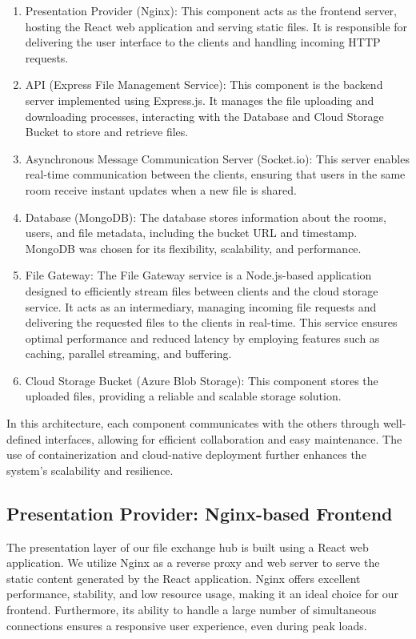 \documentclass[a4paper,fleqn]{cas-dc}
\begin{document}
\begin{enumerate}
\item Presentation Provider (Nginx): This component acts as the frontend server, hosting the React web application and serving static files. It is responsible for delivering the user interface to the clients and handling incoming HTTP requests.
\item API (Express File Management Service): This component is the backend server implemented using Express.js. It manages the file uploading and downloading processes, interacting with the Database and Cloud Storage Bucket to store and retrieve files.
\item Asynchronous Message Communication Server (Socket.io): This server enables real-time communication between the clients, ensuring that users in the same room receive instant updates when a new file is shared.
\item Database (MongoDB): The database stores information about the rooms, users, and file metadata, including the bucket URL and timestamp. MongoDB was chosen for its flexibility, scalability, and performance.
\item File Gateway: The File Gateway service is a Node.js-based application designed to efficiently stream files between clients and the cloud storage service. It acts as an intermediary, managing incoming file requests and delivering the requested files to the clients in real-time. This service ensures optimal performance and reduced latency by employing features such as caching, parallel streaming, and buffering.
\item Cloud Storage Bucket (Azure Blob Storage): This component stores the uploaded files, providing a reliable and scalable storage solution.
\end{enumerate}

In this architecture, each component communicates with the others through well-defined interfaces, allowing for efficient collaboration and easy maintenance. The use of containerization and cloud-native deployment further enhances the system's scalability and resilience.

\subsection{Presentation Provider: Nginx-based Frontend}

The presentation layer of our file exchange hub is built using a React web application. We utilize Nginx as a reverse proxy and web server to serve the static content generated by the React application. Nginx offers excellent performance, stability, and low resource usage, making it an ideal choice for our frontend. Furthermore, its ability to handle a large number of simultaneous connections ensures a responsive user experience, even during peak loads.
\end{document}
